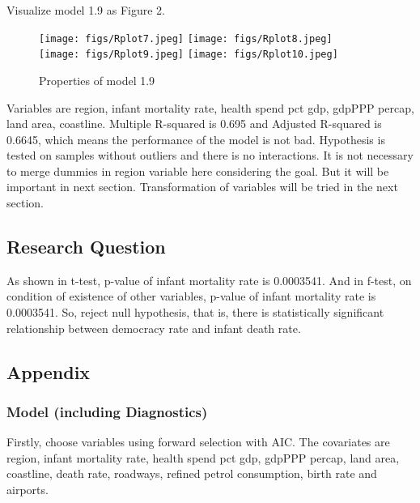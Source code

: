 Visualize model 1.9 as Figure 2.
\newpage
\begin{figure}[!htbp]
\centering 
        \texttt{[image: figs/Rplot7.jpeg]}
        \texttt{[image: figs/Rplot8.jpeg]} \\
        \texttt{[image: figs/Rplot9.jpeg]}
        \texttt{[image: figs/Rplot10.jpeg]}
\caption[Properties of model 1.9]{Properties of model 1.9}
\label{fig:example} 
\end{figure}


Variables are region, infant mortality rate, health spend pct gdp, gdpPPP percap, land area, coastline. Multiple R-squared is 0.695 and Adjusted R-squared is 0.6645, which means the performance of the model is not bad. 
Hypothesis is tested on samples without outliers and there is no interactions. It is not necessary to merge dummies in region variable here considering the goal. But it will be important in next section. Transformation of variables will be tried in the next section. 


\subsection{Research Question}
As shown in t-test, p-value of infant mortality rate is 0.0003541. And in f-test, on condition of existence of other variables, p-value of infant mortality rate is 0.0003541. So, reject null hypothesis, that is, there is statistically significant relationship between democracy rate and infant death rate. 


\subsection{Appendix}
\subsubsection{Model (including Diagnostics)}
Firstly, choose variables using forward selection with AIC. The covariates are region, infant mortality rate, health spend pct gdp, gdpPPP percap, land area,
coastline, death rate, roadways, refined petrol consumption, birth rate and airports.


